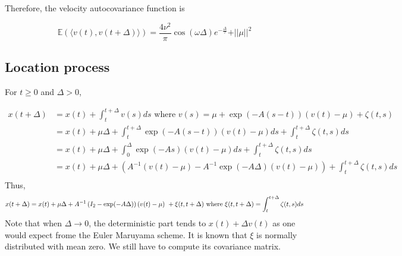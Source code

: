 \documentclass[11pt]{article}
\newcommand {\1}{\mathbb{1}}
\begin{document}
Therefore, the velocity autocovariance function is 

\begin{equation}
	\mathbb{E}(\langle v(t), v(t+\Delta) \rangle )=\frac{4\nu^2}{\pi} \cos(\omega \Delta) e^{-\frac{\Delta}{\tau}}+\vert \vert \mu \vert \vert^2
	\label{eq: RACVM autocovariance function}
\end{equation}

\subsection{Location process} \label{RACVM location process}
For $t \geq 0$ and $\Delta >0$,

\begin{align*}
	x(t+\Delta)&=x(t)+\int_t^{t+\Delta} v(s) ds \mbox{ where } v(s)=\mu+\exp(-A(s-t))(v(t)-\mu)+\zeta(t,s) \\
	&= x(t)+\mu \Delta+\int_t^{t+\Delta} \exp(-A(s-t))(v(t)-\mu) ds +\int_t^{t+\Delta} \zeta(t,s) ds \\
	&= x(t)+\mu \Delta +\int_0^{\Delta} \exp(-As)(v(t)-\mu) ds +\int_t^{t+\Delta} \zeta(t,s) ds \\
	&=x(t)+\mu \Delta + (A^{-1}(v(t)-\mu)-A^{-1}\exp(-A\Delta)(v(t)-\mu))+\int_t^{t+\Delta} \zeta(t,s) ds \\
\end{align*}
Thus, 
\begin{equation}
	x(t+\Delta)=x(t)+\mu \Delta+A^{-1} \left( I_2-\exp(-A\Delta)\right)(v(t)-\mu) +\xi(t,t+\Delta) \\
	\mbox{ where } \xi(t,t+\Delta)=\int_t^{t+\Delta} \zeta(t,s)ds
\end{equation}
Note that when $\Delta \rightarrow 0$, the deterministic part tends to $x(t)+\Delta v(t)$ as one would expect frome the Euler Maruyama scheme.
It is known that $\xi$ is normally distributed with mean zero. We still have to compute its covariance matrix.
\end{document}
